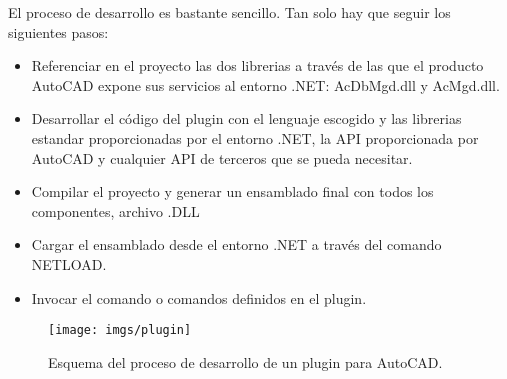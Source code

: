 El proceso de desarrollo es bastante sencillo. Tan solo hay que seguir los siguientes pasos:

\begin{itemize}

\item{Referenciar en el proyecto las dos librerias a través de las que el producto AutoCAD expone sus servicios al entorno .NET: AcDbMgd.dll y AcMgd.dll.}

\item{Desarrollar el código del plugin con el lenguaje escogido y las librerias estandar proporcionadas por el entorno .NET, la API proporcionada por AutoCAD y cualquier API de terceros que se pueda necesitar.}

\item{Compilar el proyecto y generar un ensamblado final con todos los componentes, archivo .DLL}

\item{Cargar el ensamblado desde el entorno .NET a través del comando NETLOAD.}

\item{Invocar el comando o comandos definidos en el plugin.}

\end{itemize}

\begin{figure}[H]
\begin{center}
\texttt{[image: imgs/plugin]}
\caption{Esquema del proceso de desarrollo de un plugin para AutoCAD.}
\end{center}
\end{figure}
